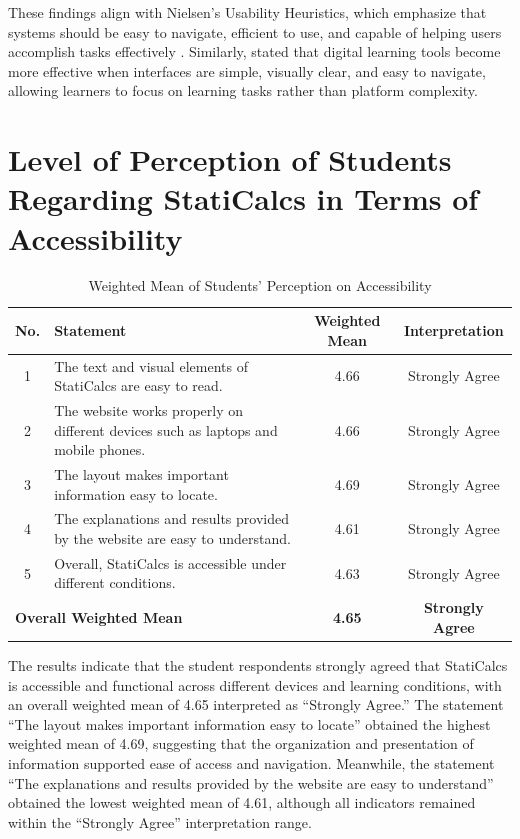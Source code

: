 These findings align with Nielsen’s Usability Heuristics, which emphasize that systems should be easy to navigate, efficient to use, and capable of helping users accomplish tasks effectively \autocite{nielsen_10_1994}. Similarly, \cite{hassan_usability_2022} stated that digital learning tools become more effective when interfaces are simple, visually clear, and easy to navigate, allowing learners to focus on learning tasks rather than platform complexity.

\section{Level of Perception of Students Regarding StatiCalcs in Terms of Accessibility}

\begin{table}[H]
\centering
\caption{Weighted Mean of Students’ Perception on Accessibility}
\renewcommand{\arraystretch}{1.3}
\begin{tabular}{cp{6.5cm}cc}
\hline
\textbf{No.} & \textbf{Statement} & \textbf{Weighted Mean} & \textbf{Interpretation}\\
\hline
1 & The text and visual elements of StatiCalcs are easy to read. & 4.66 & Strongly Agree\\
2 & The website works properly on different devices such as laptops and mobile phones. & 4.66 & Strongly Agree\\
3 & The layout makes important information easy to locate. & 4.69 & Strongly Agree\\
4 & The explanations and results provided by the website are easy to understand. & 4.61 & Strongly Agree\\
5 & Overall, StatiCalcs is accessible under different conditions. & 4.63 & Strongly Agree\\
\multicolumn{2}{l}{\textbf{Overall Weighted Mean}} & \textbf{4.65} & \textbf{Strongly Agree}\\
\hline
\end{tabular}
\end{table}

The results indicate that the student respondents strongly agreed that StatiCalcs is accessible and functional across different devices and learning conditions, with an overall weighted mean of 4.65 interpreted as ``Strongly Agree.'' The statement ``The layout makes important information easy to locate'' obtained the highest weighted mean of 4.69, suggesting that the organization and presentation of information supported ease of access and navigation. Meanwhile, the statement ``The explanations and results provided by the website are easy to understand'' obtained the lowest weighted mean of 4.61, although all indicators remained within the ``Strongly Agree'' interpretation range.

